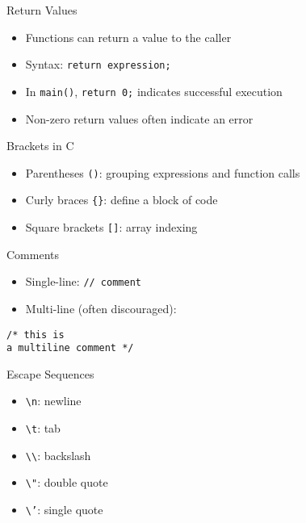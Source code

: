 \documentclass[12pt, aspectratio=169]{beamer}
\begin{document}
    \begin{frame}{Return Values}
        \begin{itemize}
            \item Functions can return a value to the caller
            \item Syntax: \texttt{return expression;}
            \item In \texttt{main()}, \texttt{return 0;} indicates successful execution
            \item Non-zero return values often indicate an error
        \end{itemize}
    \end{frame}


    \begin{frame}{Brackets in C}
        \begin{itemize}
            \item Parentheses \texttt{()}: grouping expressions and function calls
            \item Curly braces \texttt{\{\}}: define a block of code
            \item Square brackets \texttt{[]}: array indexing
        \end{itemize}
    \end{frame}


    \begin{frame}[fragile]{Comments}
        \begin{itemize}
            \item Single-line: \texttt{// comment}
            \item Multi-line (often discouraged):
        \end{itemize}
        \begin{verbatim}
/* this is
a multiline comment */
        \end{verbatim}
    \end{frame}


    \begin{frame}{Escape Sequences}
        \begin{itemize}
            \item \texttt{\textbackslash n}: newline
            \item \texttt{\textbackslash t}: tab
            \item \texttt{\textbackslash\textbackslash}: backslash
            \item \texttt{\textbackslash"}: double quote
            \item \texttt{\textbackslash'}: single quote
        \end{itemize}
    \end{frame}
\end{document}
